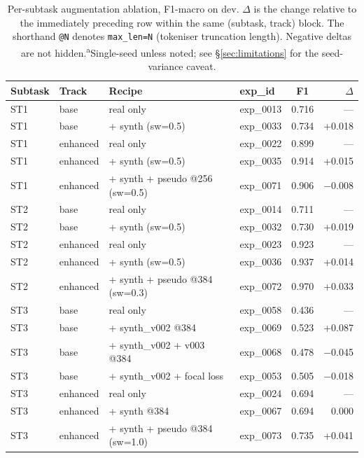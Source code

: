 \begin{table}[h]
\centering
\small
\caption{Per-subtask augmentation ablation, F1-macro on dev. $\Delta$ is the change
relative to the immediately preceding row within the same (subtask, track) block.
The shorthand \texttt{@N} denotes \texttt{max\_len=N} (tokeniser truncation length).
Negative deltas are not hidden.\textsuperscript{a}Single-seed unless noted; see \S\ref{sec:limitations} for the seed-variance caveat.}
\label{tab:ablation}
\begin{tabular}{llllcr}
\toprule
Subtask & Track & Recipe & exp\_id & F1 & $\Delta$ \\
\midrule
ST1 & base     & real only                          & exp\_0013 & 0.716 & ---     \\ %
ST1 & base     & + synth (sw=0.5)                   & exp\_0033 & 0.734 & +0.018 \\ %
\addlinespace
ST1 & enhanced & real only                          & exp\_0022 & 0.899 & ---     \\ %
ST1 & enhanced & + synth (sw=0.5)                   & exp\_0035 & 0.914 & +0.015 \\ %
ST1 & enhanced & + synth + pseudo @256 (sw=0.5)     & exp\_0071 & 0.906 & $-$0.008 \\ %
\midrule
ST2 & base     & real only                          & exp\_0014 & 0.711 & ---     \\ %
ST2 & base     & + synth (sw=0.5)                   & exp\_0032 & 0.730 & +0.019 \\ %
\addlinespace
ST2 & enhanced & real only                          & exp\_0023 & 0.923 & ---     \\ %
ST2 & enhanced & + synth (sw=0.5)                   & exp\_0036 & 0.937 & +0.014 \\ %
ST2 & enhanced & + synth + pseudo @384 (sw=0.3)     & exp\_0072 & 0.970 & +0.033 \\ %
\midrule
ST3 & base     & real only                          & exp\_0058 & 0.436 & ---     \\ %
ST3 & base     & + synth\_v002 @384                 & exp\_0069 & 0.523 & +0.087 \\ %
ST3 & base     & + synth\_v002 + v003 @384          & exp\_0068 & 0.478 & $-$0.045 \\ %
ST3 & base     & + synth\_v002 + focal loss         & exp\_0053 & 0.505 & $-$0.018 \\ %
\addlinespace
ST3 & enhanced & real only                          & exp\_0024 & 0.694 & ---     \\ %
ST3 & enhanced & + synth @384                       & exp\_0067 & 0.694 & 0.000  \\ %
ST3 & enhanced & + synth + pseudo @384 (sw=1.0)     & exp\_0073 & 0.735 & +0.041 \\ %
\bottomrule
\end{tabular}
\end{table}


